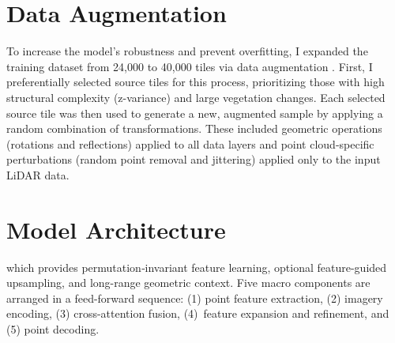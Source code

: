 \documentclass[12pt]{report}
\begin{document}
\section{Data Augmentation}
To increase the model's robustness and prevent overfitting, I expanded the training dataset from 24,000 to 40,000 tiles via data augmentation \citep{zhu2024advancements, shorten2019survey}. First, I preferentially selected source tiles for this process, prioritizing those with high structural complexity (z-variance) and large vegetation changes. Each selected source tile was then used to generate a new, augmented sample by applying a random combination of transformations. These included geometric operations (rotations and reflections) applied to all data layers and point cloud-specific perturbations (random point removal and jittering) applied only to the input LiDAR data.


\section{Model Architecture}
\label{sec:architecture}
 which provides permutation‐invariant feature learning, optional feature-guided upsampling, and long-range geometric context. Five macro components are arranged in a feed-forward sequence: (1) point feature extraction, (2) imagery encoding, (3) cross-attention fusion, (4)~feature expansion and refinement, and (5) point decoding.
\end{document}
